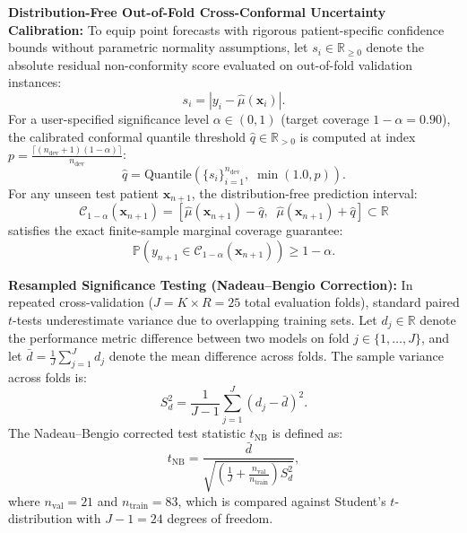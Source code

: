 \documentclass[preprint,12pt]{elsarticle}
\begin{document}
\noindent\textbf{Distribution-Free Out-of-Fold Cross-Conformal Uncertainty Calibration:} To equip point forecasts with rigorous patient-specific confidence bounds without parametric normality assumptions, let $s_i \in \mathbb{R}_{\ge 0}$ denote the absolute residual non-conformity score evaluated on out-of-fold validation instances:
\begin{equation}
s_i = |y_i - \hat{\mu}(\mathbf{x}_i)|.
\end{equation}
For a user-specified significance level $\alpha \in (0, 1)$ (target coverage $1-\alpha = 0.90$), the calibrated conformal quantile threshold $\hat{q} \in \mathbb{R}_{>0}$ is computed at index $p = \frac{\lceil (n_{\text{dev}}+1)(1-\alpha) \rceil}{n_{\text{dev}}}$:
\begin{equation}
\hat{q} = \text{Quantile}\left( \{s_i\}_{i=1}^{n_{\text{dev}}}, \; \min(1.0, p) \right).
\end{equation}
For any unseen test patient $\mathbf{x}_{n+1}$, the distribution-free prediction interval:
\begin{equation}
\mathcal{C}_{1-\alpha}(\mathbf{x}_{n+1}) = \left[ \hat{\mu}(\mathbf{x}_{n+1}) - \hat{q}, \;\; \hat{\mu}(\mathbf{x}_{n+1}) + \hat{q} \right] \subset \mathbb{R}
\end{equation}
satisfies the exact finite-sample marginal coverage guarantee:
\begin{equation}
\mathbb{P}\left( y_{n+1} \in \mathcal{C}_{1-\alpha}(\mathbf{x}_{n+1}) \right) \ge 1 - \alpha.
\end{equation}

\noindent\textbf{Resampled Significance Testing (Nadeau--Bengio Correction):} In repeated cross-validation ($J = K \times R = 25$ total evaluation folds), standard paired $t$-tests underestimate variance due to overlapping training sets. Let $d_j \in \mathbb{R}$ denote the performance metric difference between two models on fold $j \in \{1, \dots, J\}$, and let $\bar{d} = \frac{1}{J}\sum_{j=1}^J d_j$ denote the mean difference across folds. The sample variance across folds is:
\begin{equation}
S_d^2 = \frac{1}{J-1} \sum_{j=1}^J \left( d_j - \bar{d} \right)^2.
\end{equation}
The Nadeau--Bengio corrected test statistic $t_{\text{NB}}$ is defined as:
\begin{equation}
t_{\text{NB}} = \frac{\bar{d}}{\sqrt{\left( \frac{1}{J} + \frac{n_{\text{val}}}{n_{\text{train}}} \right) S_d^2}},
\end{equation}
where $n_{\text{val}} = 21$ and $n_{\text{train}} = 83$, which is compared against Student's $t$-distribution with $J-1 = 24$ degrees of freedom.
\end{document}
